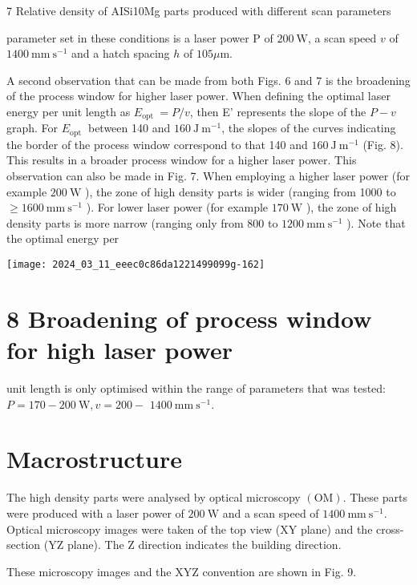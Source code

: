 \documentclass[10pt]{article}
\begin{document}
7 Relative density of AISi10Mg parts produced with different scan parameters

parameter set in these conditions is a laser power $\mathrm{P}$ of $200 \mathrm{~W}$, a scan speed $v$ of $1400 \mathrm{~mm} \mathrm{~s}^{-1}$ and a hatch spacing $h$ of $105 \mu \mathrm{m}$.

A second observation that can be made from both Figs. 6 and 7 is the broadening of the process window for higher laser power. When defining the optimal laser energy per unit length as $E_{\text {opt }}=P / v$, then E' represents the slope of the $P-v$ graph. For $E_{\text {opt }}$ between 140 and $160 \mathrm{~J} \mathrm{~m}^{-1}$, the slopes of the curves indicating the border of the process window correspond to that 140 and $160 \mathrm{~J} \mathrm{~m}^{-1}$ (Fig. 8). This results in a broader process window for a higher laser power. This observation can also be made in Fig. 7. When employing a higher laser power (for example $200 \mathrm{~W}$ ), the zone of high density parts is wider (ranging from 1000 to $\geq 1600 \mathrm{~mm} \mathrm{~s}^{-1}$ ). For lower laser power (for example $170 \mathrm{~W}$ ), the zone of high density parts is more narrow (ranging only from 800 to $1200 \mathrm{~mm} \mathrm{~s}^{-1}$ ). Note that the optimal energy per

\begin{center}
\texttt{[image: 2024\_03\_11\_eeec0c86da1221499099g-162]}
\end{center}

\section*{8 Broadening of process window for high laser power}
unit length is only optimised within the range of parameters that was tested: $P=170-200 \mathrm{~W}, v=200-$ $1400 \mathrm{~mm} \mathrm{~s}^{-1}$.

\section*{Macrostructure}
The high density parts were analysed by optical microscopy $(\mathrm{OM})$. These parts were produced with a laser power of $200 \mathrm{~W}$ and a scan speed of $1400 \mathrm{~mm} \mathrm{~s}^{-1}$. Optical microscopy images were taken of the top view (XY plane) and the cross-section (YZ plane). The Z direction indicates the building direction.

These microscopy images and the XYZ convention are shown in Fig. 9.
\end{document}
